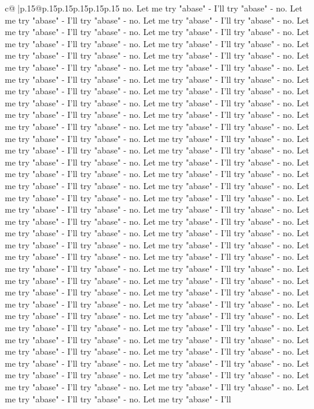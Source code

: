 \documentclass{article}
\begin{document}
{\begin{supertabular}{c@{$\;$}|p{.15\linewidth}@{}p{.15\linewidth}p{.15\linewidth}p{.15\linewidth}p{.15\linewidth}p{.15\linewidth}}
{{{no. Let me try "abase" {-} I'll try "abase" {-} no. Let me try "abase" {-} I'll try "abase" {-} no. Let me try "abase" {-} I'll try "abase" {-} no. Let me try "abase" {-} I'll try "abase" {-} no. Let me try "abase" {-} I'll try "abase" {-} no. Let me try "abase" {-} I'll try "abase" {-} no. Let me try "abase" {-} I'll try "abase" {-} no. Let me try "abase" {-} I'll try "abase" {-} no. Let me try "abase" {-} I'll try "abase" {-} no. Let me try "abase" {-} I'll try "abase" {-} no. Let me try "abase" {-} I'll try "abase" {-} no. Let me try "abase" {-} I'll try "abase" {-} no. Let me try "abase" {-} I'll try "abase" {-} no. Let me try "abase" {-} I'll try "abase" {-} no. Let me try "abase" {-} I'll try "abase" {-} no. Let me try "abase" {-} I'll try "abase" {-} no. Let me try "abase" {-} I'll try "abase" {-} no. Let me try "abase" {-} I'll try "abase" {-} no. Let me try "abase" {-} I'll try "abase" {-} no. Let me try "abase" {-} I'll try "abase" {-} no. Let me try "abase" {-} I'll try "abase" {-} no. Let me try "abase" {-} I'll try "abase" {-} no. Let me try "abase" {-} I'll try "abase" {-} no. Let me try "abase" {-} I'll try "abase" {-} no. Let me try "abase" {-} I'll try "abase" {-} no. Let me try "abase" {-} I'll try "abase" {-} no. Let me try "abase" {-} I'll try "abase" {-} no. Let me try "abase" {-} I'll try "abase" {-} no. Let me try "abase" {-} I'll try "abase" {-} no. Let me try "abase" {-} I'll try "abase" {-} no. Let me try "abase" {-} I'll try "abase" {-} no. Let me try "abase" {-} I'll try "abase" {-} no. Let me try "abase" {-} I'll try "abase" {-} no. Let me try "abase" {-} I'll try "abase" {-} no. Let me try "abase" {-} I'll try "abase" {-} no. Let me try "abase" {-} I'll try "abase" {-} no. Let me try "abase" {-} I'll try "abase" {-} no. Let me try "abase" {-} I'll try "abase" {-} no. Let me try "abase" {-} I'll try "abase" {-} no. Let me try "abase" {-} I'll try "abase" {-} no. Let me try "abase" {-} I'll try "abase" {-} no. Let me try "abase" {-} I'll try "abase" {-} no. Let me try "abase" {-} I'll try "abase" {-} no. Let me try "abase" {-} I'll try "abase" {-} no. Let me try "abase" {-} I'll try "abase" {-} no. Let me try "abase" {-} I'll try "abase" {-} no. Let me try "abase" {-} I'll try "abase" {-} no. Let me try "abase" {-} I'll try "abase" {-} no. Let me try "abase" {-} I'll try "abase" {-} no. Let me try "abase" {-} I'll try "abase" {-} no. Let me try "abase" {-} I'll try "abase" {-} no. Let me try "abase" {-} I'll try "abase" {-} no. Let me try "abase" {-} I'll try "abase" {-} no. Let me try "abase" {-} I'll try "abase" {-} no. Let me try "abase" {-} I'll try "abase" {-} no. Let me try "abase" {-} I'll try "abase" {-} no. Let me try "abase" {-} I'll try "abase" {-} no. Let me try "abase" {-} I'll try "abase" {-} no. Let me try "abase" {-} I'll try "abase" {-} no. Let me try "abase" {-} I'll try "abase" {-} no. Let me try "abase" {-} I'll try "abase" {-} no. Let me try "abase" {-} I'll try "abase" {-} no. Let me try "abase" {-} I'll try "abase" {-} no. Let me try "abase" {-} I'll try "abase" {-} no. Let me try "abase" {-} I'll try "abase" {-} no. Let me try "abase" {-} I'll try "abase" {-} no. Let me try "abase" {-} I'll }}}
\end{supertabular}}
\end{document}
